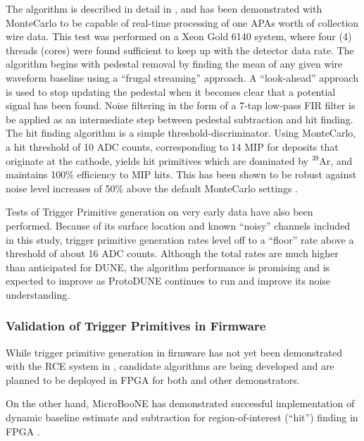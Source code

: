 The algorithm is described in detail in \cite{docid-11236}, and has been
demonstrated with MonteCarlo to be capable of real-time processing of one APAs worth
of collection wire data. This test was performed on a Xeon Gold 6140
system, where four (4) threads (cores) were found sufficient to keep
up with the detector data rate. The algorithm begins with pedestal removal by
finding the mean of any given wire waveform baseline using a ``frugal
streaming'' approach. A ``look-ahead'' approach is used to stop
updating the pedestal when it becomes clear that a potential signal
has been found. Noise filtering in the form of a 7-tap low-pass FIR
filter is be applied as an intermediate step
between pedestal subtraction and hit finding. The hit finding
algorithm is a simple threshold-discriminator. Using MonteCarlo, a hit
threshold of 10 ADC counts, corresponding to 1\/4 MIP for deposits that
originate at the cathode, yields hit primitives which are dominated by
$^39$Ar, and maintains 100\% efficiency to MIP hits. This has been
shown to be robust against noise level 
increases of 50\% above the default  MonteCarlo settings \cite{docid-11275}. 

Tests of Trigger Primitive generation on very early  data have also been
performed. Because of its surface
location and known ``noisy'' channels included in this study,
 trigger primitive generation rates level off to a ``floor'' rate above a threshold
of about 16 ADC counts. Although the total rates are much higher than
anticipated for DUNE, the algorithm performance is promising and is
expected to improve as ProtoDUNE continues
to run and improve its noise understanding.

\subsubsection{Validation of Trigger Primitives in Firmware}
\label{sec:sp-daq:validation-firmware-trigger-primitives}

While trigger primitive generation in firmware has not yet been
demonstrated with the RCE system in , candidate
algorithms are being developed and are planned to be deployed in FPGA
for both  and other demonstrators. 

On the other hand, MicroBooNE has demonstrated
successful implementation of dynamic baseline estimate and subtraction
for region-of-interest (``hit'') finding in FPGA \cite{NNN18}.


